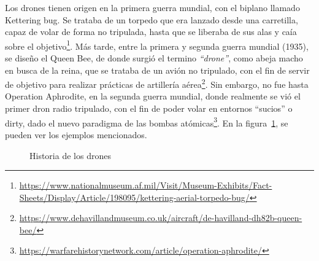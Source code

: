 Los drones tienen origen en la primera guerra mundial, con el biplano llamado Kettering bug. Se trataba de un torpedo que era lanzado desde una carretilla, capaz de volar de forma no tripulada, hasta que se liberaba de sus alas y caía sobre el objetivo\footnote[7]{\url{https://www.nationalmuseum.af.mil/Visit/Museum-Exhibits/Fact-Sheets/Display/Article/198095/kettering-aerial-torpedo-bug/}}. Más tarde, entre la primera y segunda guerra mundial (1935), se diseño el Queen Bee, de donde surgió el termino \emph{``drone''}, como abeja macho en busca de la reina, que se trataba de un avión no tripulado, con el fin de servir de objetivo para realizar prácticas de artillería aérea\footnote[8]{\url{https://www.dehavillandmuseum.co.uk/aircraft/de-havilland-dh82b-queen-bee/}}. Sin embargo, no fue hasta Operation Aphrodite, en la segunda guerra mundial, donde realmente se vió el primer dron radio tripulado, con el fin de poder volar en entornos ``sucios'' o dirty, dado el nuevo paradigma de las bombas atómicas\footnote[9]{\url{https://warfarehistorynetwork.com/article/operation-aphrodite/}}. En la figura~\ref{fig:drone_history}, se pueden ver los ejemplos mencionados.\\

\begin{figure} [tp]
	\centering
	\quad
	\quad
	\caption{Historia de los drones}
	\label{fig:drone_history}
\end{figure}

